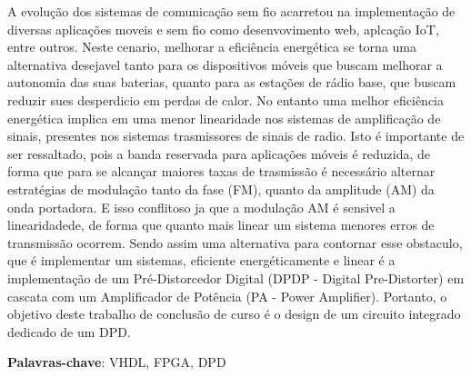     A evolução dos sistemas de comunicação sem fio acarretou na implementação de diversas aplicações moveis e sem fio como desenvovimento web, aplcação IoT, entre outros. Neste cenario, melhorar a eficiência energética se torna uma alternativa desejavel tanto para os dispositivos móveis que buscam melhorar a autonomia das suas baterias, quanto para as estações de rádio base, que buscam reduzir sues desperdicio em perdas de calor. No entanto uma melhor eficiência energética implica em uma menor linearidade nos sistemas de amplificação de sinais, presentes nos sistemas trasmissores de sinais de radio. Isto é importante de ser ressaltado, pois a banda reservada para aplicações móveis é reduzida, de forma que para se alcançar maiores taxas de trasmissão é necessário alternar estratégias de modulação tanto da fase (FM), quanto da amplitude (AM) da onda portadora. E isso conflitoso ja que a modulação AM  é sensivel a linearidadede, de forma que quanto mais linear um sistema menores erros de transmissão ocorrem. Sendo assim uma alternativa para contornar esse obstaculo, que é implementar um sistemas, eficiente energéticamente e linear é a implementação de um Pré-Distorcedor Digital (DPDP - Digital Pre-Distorter) em cascata com um Amplificador de Potência (PA - Power Amplifier). Portanto, o objetivo deste trabalho de conclusão de curso é o design de um circuito integrado dedicado de um DPD. 

\textbf{Palavras-chave}: VHDL, FPGA, DPD